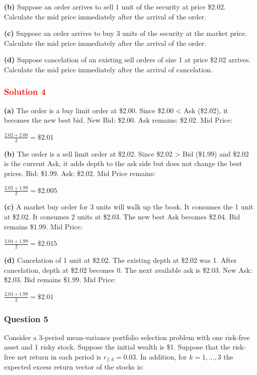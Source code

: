 \textbf{(b)} Suppose an order arrives to sell 1 unit of the security at price \$2.02. Calculate the mid price immediately after the arrival of the order.

\textbf{(c)} Suppose an order arrives to buy 3 units of the security at the market price. Calculate the mid price immediately after the arrival of the order.

\textbf{(d)} Suppose cancelation of an existing sell orders of size 1 at price \$2.02 arrives. Calculate the mid price immediately after the arrival of cancelation.

\subsubsection*{\textcolor{red}{Solution 4}}

\textbf{(a)} The order is a buy limit order at \$2.00. Since \$2.00 < Ask (\$2.02), it becomes the new best bid.
New Bid: \$2.00. Ask remains: \$2.02.
Mid Price:

\centerline{$\frac{2.02 + 2.00}{2} = \$2.01$}

\textbf{(b)} The order is a sell limit order at \$2.02. Since \$2.02 > Bid (\$1.99) and \$2.02 is the current Ask, it adds depth to the ask side but does not change the best prices.
Bid: \$1.99. Ask: \$2.02.
Mid Price remains:

\centerline{$\frac{2.02 + 1.99}{2} = \$2.005$}

\textbf{(c)} A market buy order for 3 units will walk up the book.
It consumes the 1 unit at \$2.02.
It consumes 2 units at \$2.03.
The new best Ask becomes \$2.04. Bid remains \$1.99.
Mid Price:

\centerline{$\frac{2.04 + 1.99}{2} = \$2.015$}

\textbf{(d)} Cancelation of 1 unit at \$2.02.
The existing depth at \$2.02 was 1. After cancelation, depth at \$2.02 becomes 0.
The next available ask is \$2.03.
New Ask: \$2.03. Bid remains \$1.99.
Mid Price:

\centerline{$\frac{2.03 + 1.99}{2} = \$2.01$}

\subsubsection*{Question 5}

Consider a 3-period mean-variance portfolio selection problem with one risk-free asset and 1 risky stock. Suppose the initial wealth is \$1. Suppose that the risk-free net return in each period is $r_{f,k}=0.03$. In addition, for $k=1,...,3$ the expected excess return vector of the stocks is:

